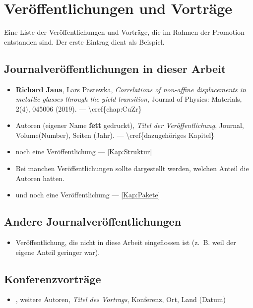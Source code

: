 \chapter*{Veröffentlichungen und Vorträge}
\label{chap:veroeffentlichungen}
Eine Liste der Veröffentlichungen und Vorträge, die im Rahmen der Promotion entstanden sind. Der erste Eintrag dient als Beispiel.

\section*{Journalveröffentlichungen in dieser Arbeit}
\begin{itemize}
  \item \textbf{Richard Jana}, Lars Pastewka, \textit{Correlations of non-affine displacements in metallic glasses through the yield transition}, Journal of Physics: Materials, 2(4), 045006 (2019). --- \textbackslash cref\{chap:CuZr\}
  \item Autoren (eigener Name \textbf{fett} gedruckt), \textit{Titel der Veröffentlichung}, Journal, Volume(Number), Seiten (Jahr). --- \textbackslash cref\{dazugehöriges Kapitel\}
  \item noch eine Veröffentlichung --- \cref{Kap:Struktur}
  \item[] Bei manchen Veröffentlichungen sollte dargestellt werden, welchen Anteil die Autoren hatten.
  \item und noch eine Veröffentlichung --- \cref{Kap:Pakete}
\end{itemize}


\section*{Andere Journalveröffentlichungen}
\begin{itemize}
  \item Veröffentlichung, die nicht in diese Arbeit eingeflossen ist (z.~B. weil der eigene Anteil geringer war).
\end{itemize}

\section*{Konferenzvorträge}
\begin{itemize}
  \item \textbf{\authorname}, weitere Autoren, \textit{Titel des Vortrags}, Konferenz, Ort, Land (Datum)
\end{itemize}
